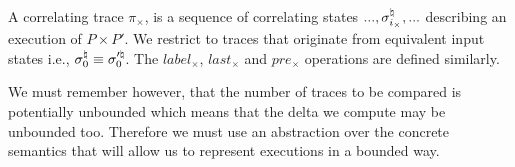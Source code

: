 \begin{definition}
A correlating trace $\pi_{\times}$, is a sequence of correlating states $..., \sigma^\natural_{i_{\times}}, ...$ describing an execution of $P \times P'$. We restrict to traces that originate from equivalent input states i.e., $\sigma^\natural_0 \equiv \sigma'^\natural_0$. The $label_{\times}$, $last_{\times}$ and $pre_{\times}$ operations are defined similarly.
\end{definition}

We must remember however, that the number of traces to be compared is potentially unbounded which means that the delta we compute may be unbounded too. Therefore we must use an abstraction over the concrete semantics that will allow us to represent executions in a bounded way.